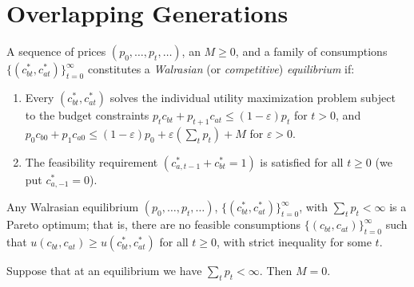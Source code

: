\section{Overlapping Generations}

\begin{defn}
    A sequence of prices $(p_0, \dots, p_t, \dots)$, an $M \geq 0$, and a family of consumptions $\{(c^*_{bt}, c^*_{at})\}_{t = 0}^\infty$ constitutes a \emph{Walrasian} (or \emph{competitive}) \emph{equilibrium} if:
    \begin{enumerate}
        \item 
        Every $(c^*_{bt}, c^*_{at})$ solves the individual utility maximization problem subject to the budget constraints $p_t c_{bt} + p_{t + 1} c_{at} \leq (1 - \varepsilon) p_t$ for $t > 0$, and $p_0 c_{b0} + p_1 c_{a0} \leq (1 - \varepsilon)p_0 + \varepsilon \left(\sum_t p_t\right) + M$ for $\varepsilon > 0$.
        
        \item 
        The feasibility requirement $(c^*_{a, t - 1} + c^*_{bt} = 1)$ is satisfied for all $t \geq 0$ (we put $c^*_{a, -1} = 0$).
    \end{enumerate}
\end{defn}

\begin{prop}
    Any Walrasian equilibrium $(p_0, \dots, p_t, \dots)$, $\{(c^*_{bt}, c^*_{at})\}_{t = 0}^\infty$, with $\sum_t p_t < \infty$ is a Pareto optimum; that is, there are no feasible consumptions $\{(c_{bt}, c_{at})\}_{t = 0}^\infty$ such that $u(c_{bt}, c_{at}) \geq u(c^*_{bt}, c^*_{at})$ for all $t \geq 0$, with strict inequality for some $t$.
\end{prop}

\begin{prop}
    Suppose that at an equilibrium we have $\sum_t p_t < \infty$. Then $M = 0$.
\end{prop}
